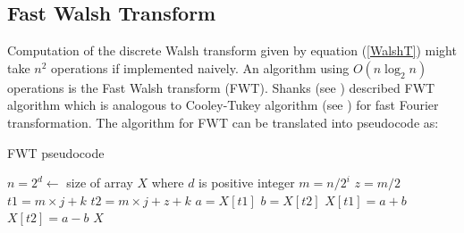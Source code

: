 \subsection{Fast Walsh Transform}
Computation of the discrete Walsh transform given by equation (\ref{WalshT}) might take $n^2$ operations 
if implemented naively.
An algorithm using $O(n \log_2 n)$ operations is the Fast Walsh transform (FWT). 
Shanks (see \cite{Shanks1969}) described FWT algorithm which is analogous to 
Cooley-Tukey algorithm (see \cite{CooleyTukey1965}) for fast Fourier transformation.
The algorithm for FWT can be translated into pseudocode as:
\begin{algorithm}[ht]
\caption{FWT pseudocode}
\label{FWTpseudo}
\begin{algorithmic}[1]

\State $n = 2^d   \gets $  size of array $X$ where $d$ is positive integer
\State $m = n/2^i$
\State $z = m/2$
\State $t1 = m \times j + k$
\State $t2 = m \times j + z +k$
\State $a = X[t1]$
\State $b= X[t2]$
\State $X[t1] = a + b$
\State $X[t2] = a - b$
\EndFor
\EndFor
\EndFor
\State \Return $X$
\EndProcedure
\end{algorithmic}
\end{algorithm}

